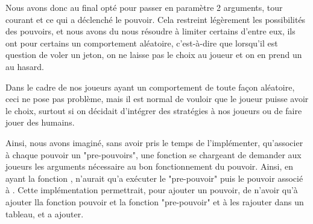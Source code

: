 Nous avons donc au final opté pour passer en paramètre 2 arguments, tour courant et ce qui a déclenché le pouvoir. Cela restreint légèrement les possibilités des pouvoirs, et nous avons du nous résoudre à limiter certains d'entre eux, ils ont pour certains un comportement aléatoire, c'est-à-dire que lorsqu'il est question de voler un jeton, on ne laisse pas le choix au joueur et on en prend un au hasard.

Dans le cadre de nos joueurs ayant un comportement de toute façon aléatoire, ceci ne pose pas problème, mais il est normal de vouloir que le joueur puisse avoir le choix, surtout si on décidait d'intégrer des stratégies à nos joueurs ou de faire jouer des humains.

Ainsi, nous avons imaginé, sans avoir pris le temps de l'implémenter, qu'associer à chaque pouvoir un "pre-pouvoirs", une fonction se chargeant de demander aux joueurs les arguments nécessaire au bon fonctionnement du pouvoir. Ainsi, en ayant la fonction , n'aurait qu'a exécuter le "pre-pouvoir" puis le pouvoir associé à . Cette implémentation permettrait, pour ajouter un pouvoir, de n'avoir qu'à ajouter lla fonction pouvoir et la fonction "pre-pouvoir" et à les rajouter dans un tableau, et a ajouter.





